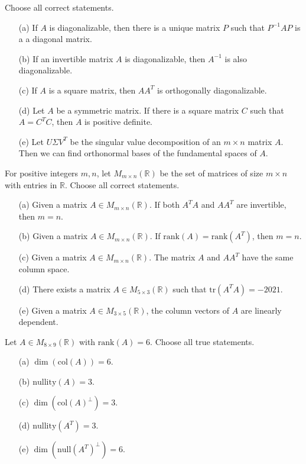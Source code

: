 \documentclass[a4paper,10pt]{article}
\makeatletter
\newlength{\Problen}
\newlength{\Probheadlen}
\newlength{\Probskip}
\newenvironment{ProbK}{\begin{lrbox}{\@syntest}%
    \begin{minipage}\textwidth}{\end{minipage}\end{lrbox}}
\newenvironment{ProbK}[2][]{ %
    \global\setbox\@lastproblem=\vbox\bgroup
    \par\noindent\parbox[t]{\Probheadlen}{\raggedleft\fontsize{10}{10pt}\selectfont
    {\bfseries\large #2 }\\[-1.5mm]
    \rule[1mm]{16mm}{.2mm}\\[-2mm]{\sffamily #1}}\hspace{\Probskip}%
    \begin{minipage}[t]{\Problen}}{\end{minipage}\par\vspace{3mm}\egroup%
    \unvcopy\@lastproblem}
\theoremstyle{remark}
\makeatother
\begin{document}
\vfill \eject


\begin{ProbK}[pt 10]{3}
Choose all correct statements.
\begin{enumerate}
	\item[(a)] If $A$ is diagonalizable, then there is a unique matrix $P$ such that $P^{-1}AP$ is a a diagonal matrix.
	\item[(b)] If an invertible matrix $A$ is diagonalizable, then $A^{-1}$ is also diagonalizable.
	\item[(c)] If $A$ is a square matrix, then $AA^T$ is orthogonally diagonalizable.
	\item[(d)] Let $A$ be a symmetric matrix. If there is a square matrix $C$ such that $A=C^TC$, then $A$ is positive definite.
	\item[(e)] Let $U\Sigma V^T$ be the singular value decomposition of an $m\times n$ matrix $A$. Then we can find orthonormal bases of the fundamental spaces of $A$. 
    \end{enumerate}


\end{ProbK}

\vskip2cm

\begin{ProbK}[pt 10]{4}
For positive integers $m,n$, let $M_{m\times n}(\mathbb{R})$ be the set of matrices of size $m\times n$ with entries in $\mathbb{R}$. Choose all correct statements.
\begin{enumerate}
	\item[(a)] Given a matrix $A\in M_{m\times n}(\mathbb{R})$. If both $A^TA$ and $AA^T$ are invertible, then $m=n$.
	\item[(b)] Given a matrix $A\in M_{m\times n}(\mathbb{R})$. If $\mathrm{rank}(A)=\mathrm{rank}(A^T)$, then $m=n$.
	\item[(c)] Given a matrix $A\in M_{m\times n}(\mathbb{R})$. The matrix $A$ and $AA^T$ have the same column space.
	\item[(d)] There exists a matrix $A\in M_{5\times 3}(\mathbb{R})$ such that $\mathrm{tr}(A^TA)=-2021$.
	\item[(e)] Given a matrix $A\in M_{3\times 5}(\mathbb{R})$, the column vectors of $A$ are linearly dependent.
    \end{enumerate}


\end{ProbK}

\vskip2cm

\begin{ProbK}[pt 10]{5}
Let $A\in M_{8\times 9}(\mathbb{R})$ with $\mathrm{rank}(A)=6.$ Choose all true statements.
\begin{enumerate}
	\item[(a)] $\dim(\mathrm{col}(A))=6.$
	\item[(b)] $\mathrm{nullity}(A)=3$.
	\item[(c)] $\dim(\mathrm{col}(A)^{\perp})=3$.
	\item[(d)] $\mathrm{nullity}(A^T)=3$.
	\item[(e)] $\dim(\mathrm{null}(A^T)^\perp)=6$.
\end{enumerate}

\end{ProbK}
\end{document}
